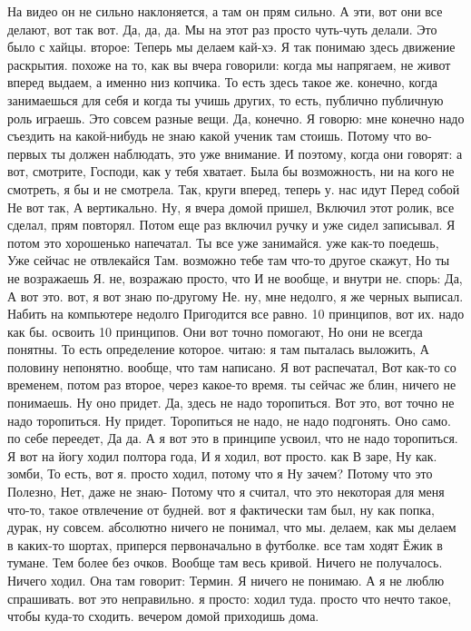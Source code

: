 На видео он не сильно наклоняется, а там он прям сильно.
А эти, вот они все делают, вот так вот.
Да, да, да.
Мы на этот раз просто чуть-чуть делали.
Это было с хайцы. второе:
Теперь мы делаем кай-хэ.
Я так понимаю здесь движение раскрытия. похоже на то, как вы вчера говорили: когда мы напрягаем, не живот вперед выдаем, а именно низ копчика.
То есть здесь такое же.
конечно, когда занимаешься для себя и когда ты учишь других, то есть, публично публичную роль играешь.
Это совсем разные вещи.
Да, конечно.
Я говорю: мне конечно надо съездить на какой-нибудь не знаю какой ученик там стоишь.
Потому что во-первых ты должен наблюдать, это уже внимание.
И поэтому, когда они говорят: а вот,
смотрите, Господи, как у тебя хватает. Была бы возможность, ни на кого не смотреть, я бы и не смотрела. Так, круги вперед, теперь у.
нас идут Перед собой Не вот так, А вертикально. Ну, я вчера домой пришел, Включил этот ролик, все сделал, прям повторял. Потом еще раз включил ручку и уже сидел записывал. Я потом это хорошенько напечатал.
Ты все уже занимайся.
уже как-то поедешь, Уже сейчас не отвлекайся Там. возможно тебе там что-то другое скажут, Но ты не возражаешь Я.
не, возражаю просто, что И не вообще, и внутри не.
спорь: Да, А вот это. вот, я вот знаю по-другому Не.
ну, мне недолго, я же черных выписал.
Набить на компьютере недолго Пригодится все равно.
10 принципов, вот их.
надо как бы.
освоить 10 принципов. Они вот точно помогают, Но они не всегда понятны. То есть определение которое.
читаю: я там пыталась выложить, А половину непонятно.
вообще, что там написано.
Я вот распечатал, Вот как-то со временем, потом раз второе, через какое-то время. ты сейчас же блин, ничего не понимаешь.
Ну оно придет.
Да, здесь не надо торопиться.
Вот это, вот точно не надо торопиться.
Ну придет.
Торопиться не надо, не надо подгонять.
Оно само.
по себе переедет, Да да.
А я вот это в принципе усвоил, что не надо торопиться. Я вот на йогу ходил полтора года, И я
ходил, вот просто.
как В заре, Ну как.
зомби, То есть, вот я.
просто ходил, потому что я Ну зачем? Потому что это Полезно, Нет, даже не знаю- Потому что я считал, что это некоторая для меня что-то, такое отвлечение от будней. вот я фактически там был, ну как попка, дурак, ну совсем.
абсолютно ничего не понимал, что мы.
делаем, как мы делаем в каких-то шортах, приперся первоначально в футболке. все там ходят Ёжик в тумане.
Тем более без очков.
Вообще там весь кривой.
Ничего не получалось.
Ничего ходил.
Она там говорит:
Термин.
Я ничего не понимаю.
А я не люблю спрашивать.
вот это неправильно. я просто:
ходил туда. просто что нечто такое, чтобы куда-то сходить. вечером домой приходишь дома.
